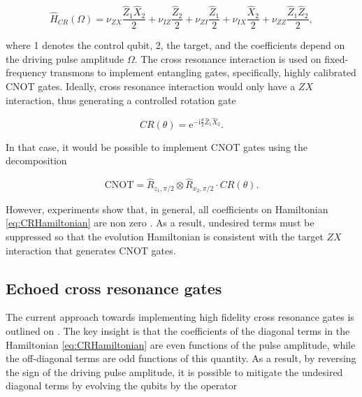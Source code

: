     \begin{equation}
      \hat{H}_{CR}(\Omega) = \nu_{ZX} \frac{\hat{Z}_1\hat{X}_2}{2} + \nu_{IZ} \frac{\hat{Z}_2}{2} + \nu_{ZI} \frac{\hat{Z}_1}{2} + \nu_{IX} \frac{\hat{X}_2}{2} + \nu_{ZZ} \frac{\hat{Z}_1\hat{Z}_2}{2},
      \label{eq:CRHamiltonian}
    \end{equation}

    \noindent where 1 denotes the control qubit, 2, the target, and the coefficients depend on the driving pulse amplitude $\Omega$. The cross resonance interaction is used on fixed-frequency transmons to implement entangling gates, specifically, highly calibrated CNOT gates. Ideally, cross resonance interaction would only have a $ZX$ interaction, thus generating a controlled rotation gate

    \begin{equation}
      CR(\theta) = \mathrm{e}^{-\mathrm{i}\frac{\theta}{2}\hat{Z}_1\hat{X}_2}.
    \end{equation}

    In that case, it would be possible to implement CNOT gates using the decomposition \cite{quantumEngineer}

    \begin{equation}
      \text{CNOT} = \hat{R}_{z_1, \pi/2} \otimes \hat{R}_{x_2, \pi/2} \cdot CR(\theta).
    \end{equation}

    However, experiments show that, in general, all coefficients on Hamiltonian \ref{eq:CRHamiltonian} are non zero \cite{DuplicatedRXZPulse, 2016RZXCalibration}. As a result, undesired terms must be suppressed so that the evolution Hamiltonian is consistent with the target $ZX$ interaction that generates CNOT gates.

  \subsection{Echoed cross resonance gates}
  \label{subsec:EchoedCrossResonance}

    The current approach towards implementing high fidelity cross resonance gates is outlined on \cite{DuplicatedRXZPulse}. The key insight is that the coefficients of the diagonal terms in the Hamiltonian \ref{eq:CRHamiltonian} are even functions of the pulse amplitude, while the off-diagonal terms are odd functions of this quantity. As a result, by reversing the sign of the driving pulse amplitude, it is possible to mitigate the undesired diagonal terms by evolving the qubits by the operator

